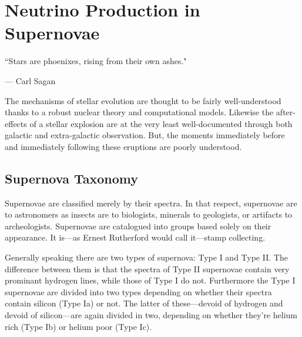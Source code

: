 %
%
%
%


\chapter{Neutrino Production in Supernovae}
	\label{supernovae_chapter}

	\vspace{-0.2in}

	\begin{quoting}
		\noindent \large ``Stars are phoenixes, rising from their own ashes." \normalsize

		--- Carl Sagan
	\end{quoting}

	 The mechanisms of stellar evolution are thought to be fairly well-understood thanks to a robust nuclear theory and computational models. Likewise the after-effects of a stellar explosion are at the very least well-documented through both galactic and extra-galactic observation. But, the moments immediately before and immediately following these eruptions are poorly understood. 
	
	\section{Supernova Taxonomy}
		Supernovae are classified merely by their spectra. In that respect, supernovae are to astronomers as insects are to biologists, minerals to geologists, or artifacts to archeologists. Supernovae are catalogued into groups based solely on their appearance. It is---as Ernest Rutherford would call it---stamp collecting. 

		Generally speaking there are two types of supernova: Type I and Type II. The difference between them is that the spectra of Type II supernovae contain very prominant hydrogen lines, while those of Type I do not. Furthermore the Type I supernovae are divided into two types depending on whether their spectra contain silicon (Type Ia) or not. The latter of these---devoid of hydrogen and devoid of silicon---are again divided in two, depending on whether they're helium rich (Type Ib) or helium poor (Type Ic). 


